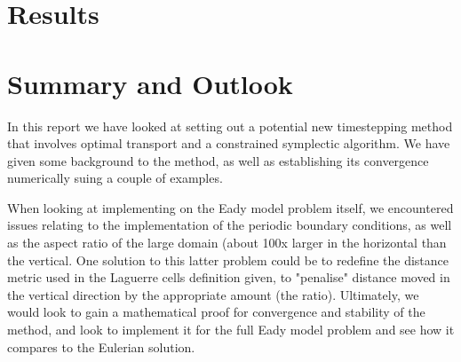 \documentclass[11pt, oneside]{article}   	%
\begin{document}
\section{Results}




\section{Summary and Outlook}

In this report we have looked at setting out a potential new timestepping method that involves optimal transport and a constrained symplectic algorithm. We have given some background to the method, as well as establishing its convergence numerically suing a couple of examples. 

When looking at implementing on the Eady model problem itself, we encountered issues relating to the implementation of the periodic boundary conditions, as well as the aspect ratio of the large domain (about 100x larger in the horizontal than the vertical. One solution to this latter problem could be to redefine the distance metric used in the Laguerre cells definition given, to "penalise" distance moved in the vertical direction by the appropriate amount (the ratio). Ultimately, we would look to gain a mathematical proof for convergence and stability of the method, and look to implement it for the full Eady model problem and see how it compares to the Eulerian solution.
\end{document}
